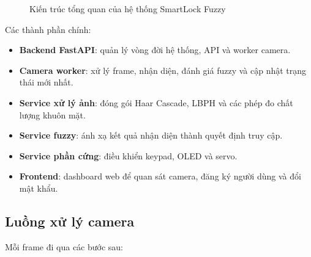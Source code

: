 \begin{figure}[H]
{
}
\caption{Kiến trúc tổng quan của hệ thống SmartLock Fuzzy}
\label{fig:system_architecture}
\end{figure}

Các thành phần chính:

\begin{itemize}
    \item \textbf{Backend FastAPI}: quản lý vòng đời hệ thống, API và worker camera.
    \item \textbf{Camera worker}: xử lý frame, nhận diện, đánh giá fuzzy và cập nhật trạng thái mới nhất.
    \item \textbf{Service xử lý ảnh}: đóng gói Haar Cascade, LBPH và các phép đo chất lượng khuôn mặt.
    \item \textbf{Service fuzzy}: ánh xạ kết quả nhận diện thành quyết định truy cập.
    \item \textbf{Service phần cứng}: điều khiển keypad, OLED và servo.
    \item \textbf{Frontend}: dashboard web để quan sát camera, đăng ký người dùng và đổi mật khẩu.
\end{itemize}

\subsection{Luồng xử lý camera}

Mỗi frame đi qua các bước sau:

